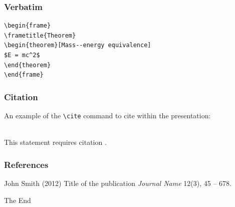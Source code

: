\documentclass[aspectratio=169]{beamer}
\begin{document}

\begin{frame}[fragile] %
\frametitle{Verbatim}
\begin{example}
\begin{verbatim}
\begin{frame}
\frametitle{Theorem}
\begin{theorem}[Mass--energy equivalence]
$E = mc^2$
\end{theorem}
\end{frame}\end{verbatim}
\end{example}
\end{frame}


\begin{frame}[fragile] %
\frametitle{Citation}
An example of the \verb|\cite| command to cite within the presentation:\\~

This statement requires citation \cite{p1}.
\end{frame}


\begin{frame}
\frametitle{References}
\footnotesize{
\begin{thebibliography}{99} %
 John Smith (2012)
\newblock Title of the publication
\newblock \emph{Journal Name} 12(3), 45 -- 678.
\end{thebibliography}
}
\end{frame}


\begin{frame}
\Huge{\centerline{The End}}
\end{frame}

\end{document}
